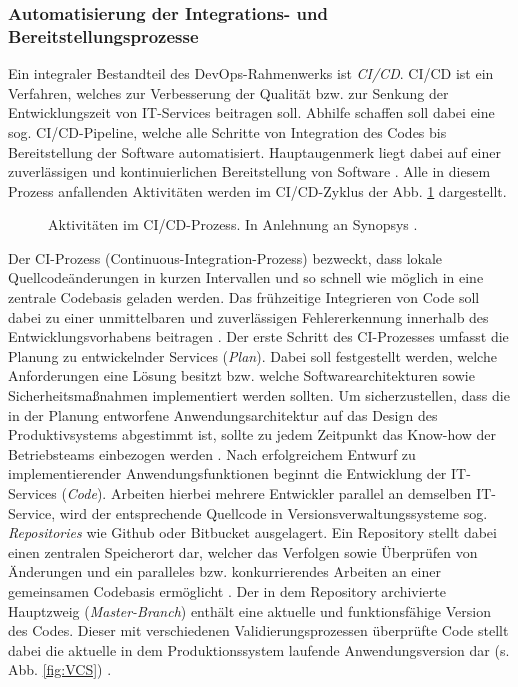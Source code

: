 \subsubsection{Automatisierung der Integrations- und Bereitstellungsprozesse}
\label{sec:CICD}
 Ein integraler Bestandteil des DevOps-Rahmen\-werks ist \textit{\ac{CI/CD}}. CI/CD ist ein Verfahren, welches zur Verbesserung der Qualität bzw. zur Senkung der Entwicklungszeit von IT-Services beitragen soll. Abhilfe schaffen soll dabei eine sog. CI/CD-Pipeline, welche alle Schritte von Integration des Codes  bis Bereitstellung der Software automatisiert. Hauptaugenmerk liegt dabei auf einer zuverlässigen und kontinuierlichen Bereitstellung von Software \cite[471]{Zampetti.92720211012021}. Alle in diesem Prozess anfallenden Aktivitäten werden im CI/CD-Zyklus der Abb. \ref{fig:CICD_Cycle} dargestellt. 
 \begin{center}
	\begin{figure}[H]
		\centering
		\captionsetup{format=myformat}
		\caption[Aktivitäten im CI/CD-Prozess]{Aktivitäten im CI/CD-Prozess. In Anlehnung an Synopsys \cite{.20230201}.}
		\label{fig:CICD_Cycle}
	\end{figure}
\end{center}
\vspace*{-15mm}
Der \acs{CI}-Prozess (Continuous-Integration-Prozess) bezweckt, dass lokale Quellcode\-änderungen in kurzen Intervallen und so schnell wie möglich in eine zentrale Codebasis geladen werden. Das frühzeitige Integrieren von Code soll dabei zu einer unmittelbaren und zuverlässigen Fehlererkennung innerhalb des Entwicklungsvorhabens beitragen \cite[471]{Zampetti.92720211012021}. 
Der erste Schritt des CI-Prozesses umfasst die Planung zu entwickelnder Services (\textit{Plan}). Dabei soll festgestellt werden, welche Anforderungen eine Lösung besitzt bzw. welche Softwarearchitekturen sowie Sicherheitsmaßnahmen implementiert werden sollten. Um sicherzustellen, dass die in der Planung entworfene Anwendungsarchitektur auf das Design des Produktivsystems abgestimmt ist, sollte zu jedem Zeitpunkt das Know-how der Betriebsteams einbezogen werden \cite[16]{Halstenberg.2020}. Nach erfolgreichem Entwurf zu implementierender Anwendungsfunktionen beginnt die Entwicklung der IT-Services (\textit{Code}). Arbeiten hierbei mehrere Entwickler parallel an demselben IT-Service, wird der entsprechende Quellcode in Versionsverwaltungssysteme sog. \textit{Repositories} wie Github oder Bitbucket ausgelagert.
Ein Repository stellt dabei einen zentralen Speicherort dar, welcher das Verfolgen sowie Überprüfen von Änderungen und ein paralleles bzw. konkurrierendes Arbeiten an einer gemeinsamen Codebasis ermöglicht \cite[1]{Blischak.2016}. Der in dem Repository archivierte Hauptzweig (\textit{Master-Branch}) enthält eine aktuelle und funktionsfähige Version des Codes. Dieser mit verschiedenen Validierungsprozessen überprüfte Code stellt dabei die aktuelle in dem Produktionssystem laufende Anwendungsversion dar (s. Abb. \ref{fig:VCS}) \cite[337]{Schmiedmayer.52220225242022}.
